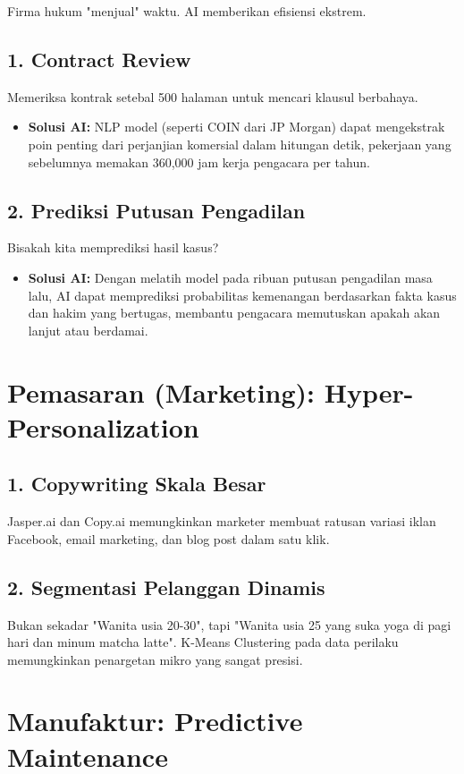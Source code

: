 Firma hukum "menjual" waktu. AI memberikan efisiensi ekstrem.

\subsection{1. Contract Review}
Memeriksa kontrak setebal 500 halaman untuk mencari klausul berbahaya.
\begin{itemize}
    \item \textbf{Solusi AI:} NLP model (seperti COIN dari JP Morgan) dapat mengekstrak poin penting dari perjanjian komersial dalam hitungan detik, pekerjaan yang sebelumnya memakan 360,000 jam kerja pengacara per tahun.
\end{itemize}

\subsection{2. Prediksi Putusan Pengadilan}
Bisakah kita memprediksi hasil kasus?
\begin{itemize}
    \item \textbf{Solusi AI:} Dengan melatih model pada ribuan putusan pengadilan masa lalu, AI dapat memprediksi probabilitas kemenangan berdasarkan fakta kasus dan hakim yang bertugas, membantu pengacara memutuskan apakah akan lanjut atau berdamai.
\end{itemize}

\section{Pemasaran (Marketing): Hyper-Personalization}

\subsection{1. Copywriting Skala Besar}
Jasper.ai dan Copy.ai memungkinkan marketer membuat ratusan variasi iklan Facebook, email marketing, dan blog post dalam satu klik.

\subsection{2. Segmentasi Pelanggan Dinamis}
Bukan sekadar "Wanita usia 20-30", tapi "Wanita usia 25 yang suka yoga di pagi hari dan minum matcha latte". K-Means Clustering pada data perilaku memungkinkan penargetan mikro yang sangat presisi.

\section{Manufaktur: Predictive Maintenance}

